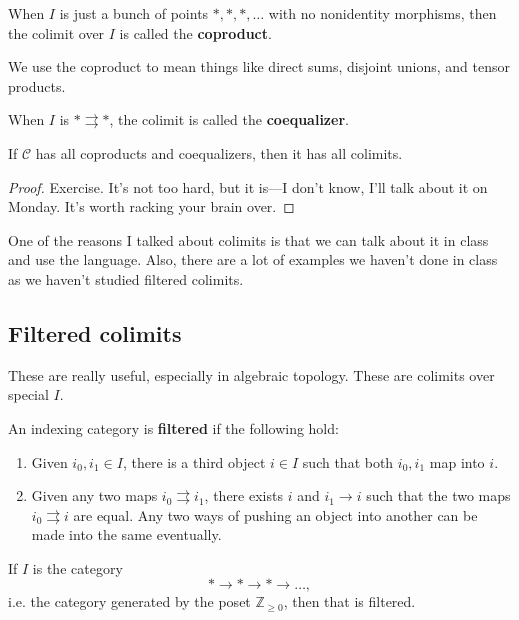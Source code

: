 \begin{definition} 
When $I$ is just a bunch of points  $\ast, \ast, \ast, \dots$ with no nonidentity morphisms, then the
colimit over $I$ is called the \textbf{coproduct}.
\end{definition} 

We use the coproduct to mean things like direct sums, disjoint unions, and
tensor products. 

\begin{definition} 
When $I$ is $\ast \rightrightarrows \ast$, the colimit is called the
\textbf{coequalizer}.
\end{definition} 

\begin{theorem} 
If $\mathcal{C}$ has all coproducts and coequalizers, then it has all colimits. 
\end{theorem} 

\begin{proof} 
Exercise. It's not too hard, but it is---I don't know, I'll talk about it on
Monday. It's worth racking your brain over.
\end{proof} 

One of the reasons I talked about colimits is that we can talk about it in
class and use the language. Also, there are a lot of examples we haven't done
in class as we haven't studied filtered colimits.

\subsection{Filtered colimits}

These are really useful, especially in algebraic topology. These are colimits
over special $I$.

\begin{definition} 
An indexing category is \textbf{filtered} if the following hold:
\begin{enumerate}
\item Given $i_0, i_1 \in I$, there is a third object $i \in I$ such that both
$i_0, i_1$ map into $i$. 
\item Given any two maps $i_0 \rightrightarrows i_1$, there exists $i$ and $i_1
\to i$ such that the two maps $i_0 \rightrightarrows i$ are equal. Any two ways
of pushing an object into another can be made into the same eventually. 
\end{enumerate}
\end{definition} 

\begin{example} 
If $I$ is the category
\[ \ast \to \ast \to \ast \to \dots,  \]
i.e. the category generated by the poset $\mathbb{Z}_{\geq 0}$, then that is
filtered.
\end{example} 

